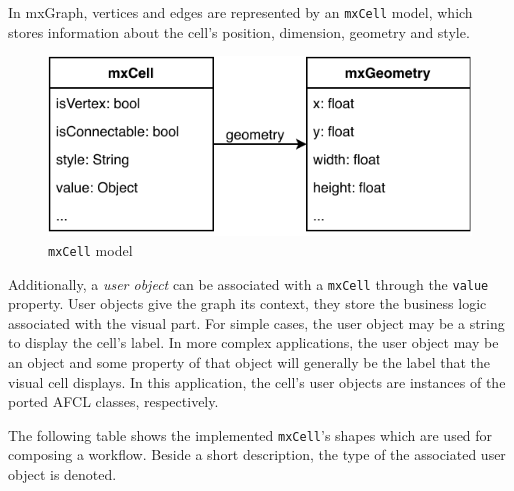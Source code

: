 \documentclass[a4paper,12pt,pdftex,halfparskip,cleardoubleempty,bibtotoc,liststotoc]{scrbook}
\begin{document}
In mxGraph, vertices and edges are represented by an \texttt{mxCell} model, which stores information about the cell's position, dimension, geometry and style.

\begin{figure}[H]
  \centering
  \vspace{0.8cm}
  \includegraphics[]{mxCell}
  \caption{\texttt{mxCell} model}
\end{figure}

Additionally, a \textit{user object} can be associated with a \texttt{mxCell} through the \texttt{value} property. User objects give the graph its context, they store the business logic associated with the visual part. \cite{manuals-mxgraph-user-manual} For simple cases, the user object may be a string to display the cell's label. In more complex applications, the user object may be an object and some property of that object will generally be the label that the visual cell displays. In this application, the cell's user objects are instances of the ported AFCL classes, respectively.

The following table shows the implemented \texttt{mxCell}'s shapes which are used for composing a workflow. Beside a short description, the type of the associated user object is denoted.
\end{document}
